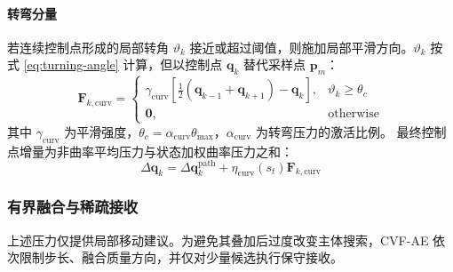 \paragraph{转弯分量}
若连续控制点形成的局部转角 $\vartheta_k$ 接近或超过阈值，则施加局部平滑方向。$\vartheta_k$ 按式 \eqref{eq:turning-angle} 计算，但以控制点 $\mathbf q_k$ 替代采样点 $\mathbf p_m$：
\begin{equation}
    \mathbf{F}_{k,\mathrm{curv}}=
    \begin{cases}
    \gamma_{\mathrm{curv}}
    \left[\tfrac{1}{2}(\mathbf{q}_{k-1}+\mathbf{q}_{k+1})-\mathbf{q}_k\right],
    & \vartheta_k\geq \theta_c\\[4pt]
    \mathbf 0,
    & \mathrm{otherwise}
    \end{cases}
    \label{eq:curvature-field}
\end{equation}
其中 $\gamma_{\mathrm{curv}}$ 为平滑强度，$\theta_c=\alpha_{\mathrm{curv}}\theta_{\max}$，$\alpha_{\mathrm{curv}}$ 为转弯压力的激活比例。
最终控制点增量为非曲率平均压力与状态加权曲率压力之和：
\begin{equation}
    \Delta\mathbf q_k
    =
    \Delta\mathbf q_k^{\mathrm{path}}
    +
    \eta_{\mathrm{curv}}(s_t)\mathbf F_{k,\mathrm{curv}}
    \label{eq:cvf-control-increment}
\end{equation}

\subsubsection{有界融合与稀疏接收}

上述压力仅提供局部移动建议。为避免其叠加后过度改变主体搜索，CVF-AE 依次限制步长、融合质量方向，并仅对少量候选执行保守接收。

